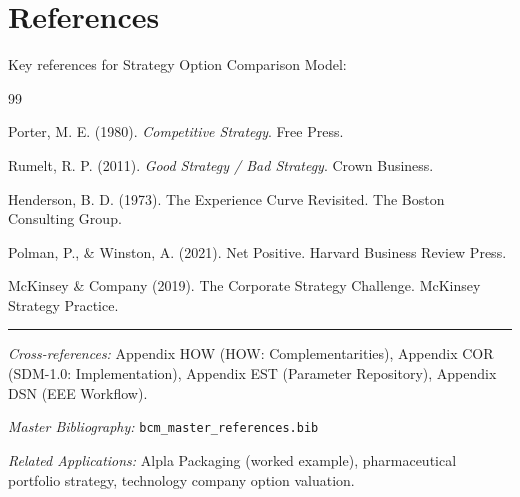 \section{References}
\label{sec:socm-references}

Key references for Strategy Option Comparison Model:

\nocite{bcm_master}

\begin{thebibliography}{99}

 Porter, M. E. (1980). \textit{Competitive Strategy}. Free Press.

 Rumelt, R. P. (2011). \textit{Good Strategy / Bad Strategy}. Crown Business.

 Henderson, B. D. (1973). The Experience Curve Revisited. The Boston Consulting Group.

 Polman, P., \& Winston, A. (2021). Net Positive. Harvard Business Review Press.

 McKinsey \& Company (2019). The Corporate Strategy Challenge. McKinsey Strategy Practice.

\end{thebibliography}


\vspace{1em}
\hrule
\vspace{0.5em}

\noindent\textit{Cross-references:}
Appendix HOW (HOW: Complementarities),
Appendix COR (SDM-1.0: Implementation),
Appendix EST (Parameter Repository),
Appendix DSN (EEE Workflow).

\noindent\textit{Master Bibliography:} \texttt{bcm\_master\_references.bib}

\noindent\textit{Related Applications:} Alpla Packaging (worked example), pharmaceutical portfolio strategy, technology company option valuation.

